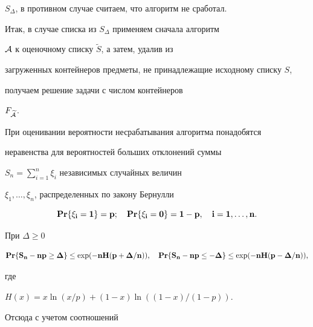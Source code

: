 $S_{\Delta}$, в противном случае считаем, что алгоритм не сработал.





Итак, в случае списка из $S_{\Delta}$ применяем сначала алгоритм


${\cal A}$ к оценочному списку $\widetilde S$, а затем, удалив из


загруженных контейнеров предметы, не принадлежащие исходному списку $S$,


получаем решение задачи с числом контейнеров


$F_{\widetilde {\cal A}}$.





При оценивании вероятности несрабатывания алгоритма понадобятся


неравенства для вероятностей больших отклонений суммы


$S_{n}=\sum\limits_{i=1}^{n}\xi_{i} $ независимых случайных величин


$\xi_{1},\dotsc,\xi_n$, распределенных по закону Бернулли


$$


\PR \{\xi_{i}=1\} =p;\quad


\PR \{\xi_{i}=0\} =1-p,\quad i=1,\dotsc,n.


$$





\begin{lem}


\label{lm3}


При $\Delta \ge 0 $


$$


\PR \{S_{n}-np \ge \Delta\} \le


\exp(-nH (p+\Delta/n)),\quad


%


\PR \{S_{n}-np \le -\Delta \} \le


\exp (-nH ( p-\Delta /n )),


$$


где


$H(x) = x \ln (x/p) + (1-x) \ln((1-x)/(1-p))$.


\end{lem}





Отсюда с учетом соотношений


$$



